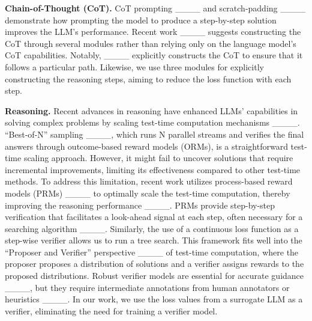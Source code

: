 \noindent \textbf{Chain-of-Thought (CoT).} CoT prompting ____ and scratch-padding ____ demonstrate how prompting the model to produce a step-by-step solution improves the LLM's performance. Recent work ____ suggests constructing the CoT through several modules rather than relying only on the language model's CoT capabilities. Notably,  ____ explicitly constructs the CoT to ensure that it follows a particular path. Likewise, we use three modules for explicitly constructing the reasoning steps, aiming to reduce the loss function with each step.

\noindent \textbf{Reasoning.} 
Recent advances in reasoning have enhanced LLMs’ capabilities in solving complex problems by scaling test-time computation mechanisms ____. 
``Best-of-N'' sampling ____, which runs N parallel streams and verifies the final answers through outcome-based reward models (ORMs), is a straightforward test-time scaling approach.
However, it might fail to uncover solutions that require incremental improvements, limiting its effectiveness compared to other test-time methods. 
To address this limitation, recent work utilizes process-based reward models (PRMs) ____ to optimally scale the test-time computation, thereby improving the reasoning performance ____. 
PRMs provide step-by-step verification that facilitates a look-ahead signal at each step, often necessary for a searching algorithm ____. 
Similarly, the use of a continuous loss function as a step-wise verifier allows us to run a tree search. 
This framework fits well into the ``Proposer and Verifier'' perspective ____ of test-time computation, where the proposer proposes a distribution of solutions and a verifier assigns rewards to the proposed distributions.  
Robust verifier models are essential for accurate guidance ____, but they require intermediate annotations from human annotators or heuristics ____. 
In our work, we use the loss values from a surrogate LLM as a verifier, eliminating the need for training a verifier model. 

